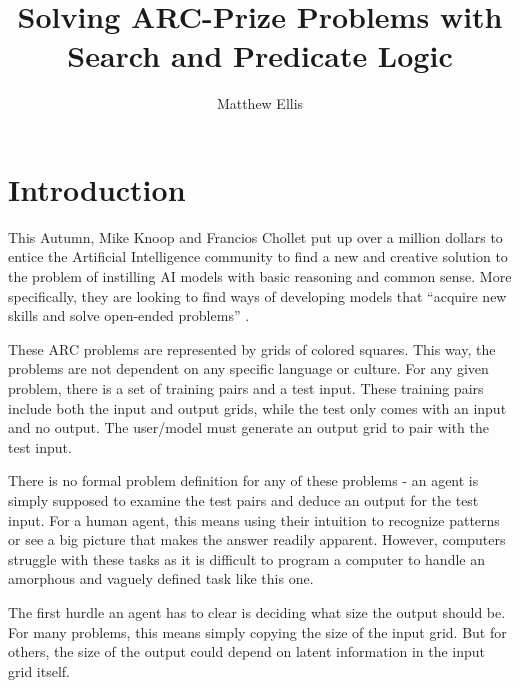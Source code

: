 \documentclass[letterpaper]{article} %
\title{Solving ARC-Prize Problems with Search and Predicate Logic}
\author{
    Matthew Ellis
}
\begin{document}
\maketitle


%

\section{Introduction}
This Autumn, Mike Knoop and Francios Chollet put up over a million dollars to entice the Artificial Intelligence community to find a new and creative solution to the problem of instilling AI models with basic reasoning and common sense. More specifically, they are looking to find ways of developing models that ``acquire new skills and solve open-ended problems'' \cite{arcprize}.

These ARC problems are represented by grids of colored squares. This way, the problems are not dependent on any specific language or culture. For any given problem, there is a set of training pairs and a test input. These training pairs include both the input and output grids, while the test only comes with an input and no output. The user/model must generate an output grid to pair with the test input.

There is no formal problem definition for any of these problems - an agent is simply supposed to examine the test pairs and deduce an output for the test input. For a human agent, this means using their intuition to recognize patterns or see a big picture that makes the answer readily apparent. However, computers struggle with these tasks as it is difficult to program a computer to handle an amorphous and vaguely defined task like this one.

\bigskip

The first hurdle an agent has to clear is deciding what size the output should be. For many problems, this means simply copying the size of the input grid. But for others, the size of the output could depend on latent information in the input grid itself.
\end{document}
